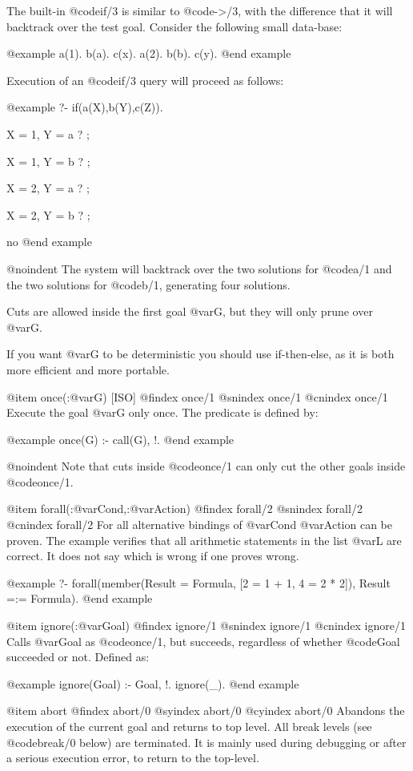 {{{{The built-in @code{if/3} is similar to @code{->/3}, with the difference
that it will backtrack over the test goal. Consider the following
small data-base:

@example
a(1).        b(a).          c(x).
a(2).        b(b).          c(y).
@end example

Execution of an @code{if/3} query will proceed as follows:

@example
   ?- if(a(X),b(Y),c(Z)).

X = 1,
Y = a ? ;

X = 1,
Y = b ? ;

X = 2,
Y = a ? ;

X = 2,
Y = b ? ;

no
@end example


@noindent
The system will backtrack over the two solutions for @code{a/1} and the
two solutions for @code{b/1}, generating four solutions.

Cuts are allowed inside the first goal @var{G}, but they will only prune
over @var{G}.

If you want @var{G} to be deterministic you should use if-then-else, as
it is both more efficient and more portable.

@item once(:@var{G}) [ISO]
@findex once/1
@snindex once/1
@cnindex once/1
Execute the goal @var{G} only once. The predicate is defined by:

@example
 once(G) :- call(G), !.
@end example

@noindent
Note that cuts inside @code{once/1} can only cut the other goals inside
@code{once/1}.

@item forall(:@var{Cond},:@var{Action})
@findex forall/2
@snindex forall/2
@cnindex forall/2
For all alternative bindings of @var{Cond} @var{Action} can be
proven. The example verifies that all arithmetic statements in the list
@var{L} are correct. It does not say which is wrong if one proves wrong.

@example
?- forall(member(Result = Formula, [2 = 1 + 1, 4 = 2 * 2]),
                 Result =:= Formula).
@end example

@item ignore(:@var{Goal})
@findex ignore/1
@snindex ignore/1
@cnindex ignore/1
Calls @var{Goal} as @code{once/1}, but succeeds, regardless of whether
@code{Goal} succeeded or not. Defined as:

@example
ignore(Goal) :-
        Goal, !.
ignore(_).
@end example

@item abort
@findex abort/0
@syindex abort/0
@cyindex abort/0
Abandons the execution of the current goal and returns to top level. All
break levels (see @code{break/0} below) are terminated. It is mainly
used during debugging or after a serious execution error, to return to
the top-level.


}}}}
